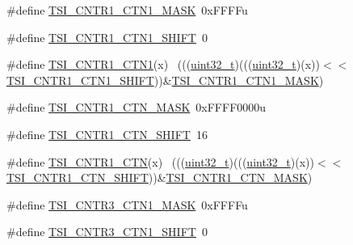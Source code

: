 \begin{DoxyCompactItemize}
\item 
\#define \hyperlink{group___t_s_i___register___masks_ga7d2647f0e7166cd22930dc7d15726bdc}{T\+S\+I\+\_\+\+C\+N\+T\+R1\+\_\+\+C\+T\+N1\+\_\+\+M\+A\+SK}~0x\+F\+F\+F\+Fu
\item 
\#define \hyperlink{group___t_s_i___register___masks_ga51545c15d46b9d961b3cd8a2aed33e46}{T\+S\+I\+\_\+\+C\+N\+T\+R1\+\_\+\+C\+T\+N1\+\_\+\+S\+H\+I\+FT}~0
\item 
\#define \hyperlink{group___t_s_i___register___masks_ga2a691594a820a057852e27a1576af469}{T\+S\+I\+\_\+\+C\+N\+T\+R1\+\_\+\+C\+T\+N1}(x)                                            ~(((\hyperlink{_p_e___types_8h_a33594304e786b158f3fb30289278f5af}{uint32\+\_\+t})(((\hyperlink{_p_e___types_8h_a33594304e786b158f3fb30289278f5af}{uint32\+\_\+t})(x))$<$$<$\hyperlink{group___t_s_i___register___masks_ga51545c15d46b9d961b3cd8a2aed33e46}{T\+S\+I\+\_\+\+C\+N\+T\+R1\+\_\+\+C\+T\+N1\+\_\+\+S\+H\+I\+FT}))\&\hyperlink{group___t_s_i___register___masks_ga7d2647f0e7166cd22930dc7d15726bdc}{T\+S\+I\+\_\+\+C\+N\+T\+R1\+\_\+\+C\+T\+N1\+\_\+\+M\+A\+SK})
\item 
\#define \hyperlink{group___t_s_i___register___masks_ga5c1efa805b567ae0b51c7b93c396afd5}{T\+S\+I\+\_\+\+C\+N\+T\+R1\+\_\+\+C\+T\+N\+\_\+\+M\+A\+SK}~0x\+F\+F\+F\+F0000u
\item 
\#define \hyperlink{group___t_s_i___register___masks_gafaa522509f837ff019a51e3c70e44261}{T\+S\+I\+\_\+\+C\+N\+T\+R1\+\_\+\+C\+T\+N\+\_\+\+S\+H\+I\+FT}~16
\item 
\#define \hyperlink{group___t_s_i___register___masks_ga7136c31bbd395dd222bff4c650e768dc}{T\+S\+I\+\_\+\+C\+N\+T\+R1\+\_\+\+C\+TN}(x)                                              ~(((\hyperlink{_p_e___types_8h_a33594304e786b158f3fb30289278f5af}{uint32\+\_\+t})(((\hyperlink{_p_e___types_8h_a33594304e786b158f3fb30289278f5af}{uint32\+\_\+t})(x))$<$$<$\hyperlink{group___t_s_i___register___masks_gafaa522509f837ff019a51e3c70e44261}{T\+S\+I\+\_\+\+C\+N\+T\+R1\+\_\+\+C\+T\+N\+\_\+\+S\+H\+I\+FT}))\&\hyperlink{group___t_s_i___register___masks_ga5c1efa805b567ae0b51c7b93c396afd5}{T\+S\+I\+\_\+\+C\+N\+T\+R1\+\_\+\+C\+T\+N\+\_\+\+M\+A\+SK})
\item 
\#define \hyperlink{group___t_s_i___register___masks_ga944c52b8a9c3019342c1c27eb7ab5d1f}{T\+S\+I\+\_\+\+C\+N\+T\+R3\+\_\+\+C\+T\+N1\+\_\+\+M\+A\+SK}~0x\+F\+F\+F\+Fu
\item 
\#define \hyperlink{group___t_s_i___register___masks_ga40857a8de39e7f24268f2209546b7d92}{T\+S\+I\+\_\+\+C\+N\+T\+R3\+\_\+\+C\+T\+N1\+\_\+\+S\+H\+I\+FT}~0

\end{DoxyCompactItemize}
